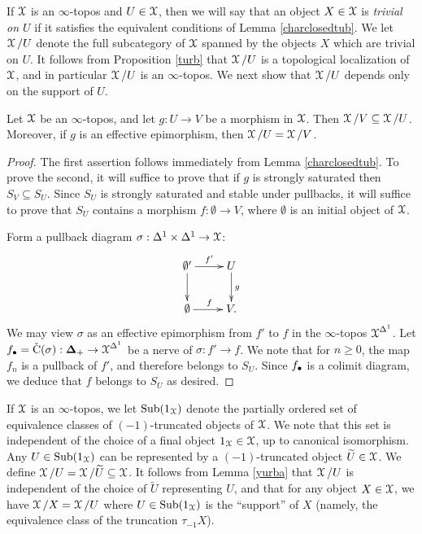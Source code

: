 If $\operatorname{\mathcal{X}}$ is an $\infty$-topos and $U \in \operatorname{\mathcal{X}}$, then we will say that an object
$X \in \operatorname{\mathcal{X}}$ is {\it trivial on $U$}
if it satisfies the equivalent conditions of Lemma \ref{charclosedtub}. We let $\operatorname{\mathcal{X}}/U$ denote the full subcategory of $\operatorname{\mathcal{X}}$ spanned by the objects $X$ which are trivial on $U$. It follows from Proposition \ref{turb} that $\operatorname{\mathcal{X}}/U$ is a topological localization of $\operatorname{\mathcal{X}}$, and in particular $\operatorname{\mathcal{X}}/U$ is an $\infty$-topos. We next show that
$\operatorname{\mathcal{X}}/U$ depends only on the support of $U$.

\begin{lemma}\label{yurba}
Let $\operatorname{\mathcal{X}}$ be an $\infty$-topos, and let $g: U \rightarrow V$ be a morphism in
$\operatorname{\mathcal{X}}$. Then $\operatorname{\mathcal{X}}/V \subseteq \operatorname{\mathcal{X}}/U$. Moreover, if $g$ is an effective epimorphism, then
$\operatorname{\mathcal{X}}/U = \operatorname{\mathcal{X}}/V$. 
\end{lemma}

\begin{proof}
The first assertion follows immediately from Lemma \ref{charclosedtub}. To prove the
second, it will suffice to prove that if $g$ is strongly saturated then $S_{V} \subseteq S_{U}$. Since $S_{U}$ is strongly saturated and stable under pullbacks, it will suffice to prove that $S_{U}$ contains a morphism
$f: \emptyset \rightarrow V$, where $\emptyset$ is an initial object of $\operatorname{\mathcal{X}}$.

Form a pullback diagram $\sigma: \Delta^1 \times \Delta^1 \rightarrow \operatorname{\mathcal{X}}$:
$$ \xymatrix{ \emptyset' \ar[r]^{f'} \ar[d] & U \ar[d]^{g} \\
\emptyset \ar[r]^{f} & V.}$$ We may view $\sigma$ as an effective epimorphism
from $f'$ to $f$ in the $\infty$-topos $\operatorname{\mathcal{X}}^{\Delta^1}$. Let $f_{\bullet} = \operatorname{\check{C}}(\sigma): \operatorname{{\bf \Delta}}_{+} \rightarrow \operatorname{\mathcal{X}}^{\Delta^1}$ be a \Cech nerve of $\sigma: f' \rightarrow f$. We note that
for $n \geq 0$, the map $f_n$ is a pullback of $f'$, and therefore belongs to $S_{U}$. Since
$f_{\bullet}$ is a colimit diagram, we deduce that $f$ belongs to $S_{U}$ as desired.
\end{proof}

If $\operatorname{\mathcal{X}}$ is an $\infty$-topos, we let $\operatorname{Sub}(1_{\operatorname{\mathcal{X}}})$ denote the partially ordered set of equivalence classes of $(-1)$-truncated objects of $\operatorname{\mathcal{X}}$. We note that this set is independent of the choice of a final object $1_{\operatorname{\mathcal{X}}} \in \operatorname{\mathcal{X}}$, up to canonical isomorphism.
Any $U \in \operatorname{Sub}(1_{\operatorname{\mathcal{X}}})$ can be represented by a $(-1)$-truncated object $\widetilde{U} \in \operatorname{\mathcal{X}}$. We define $\operatorname{\mathcal{X}}/U = \operatorname{\mathcal{X}}/ \widetilde{U} \subseteq \operatorname{\mathcal{X}}$. It follows from Lemma \ref{yurba} that $\operatorname{\mathcal{X}}/U$ is independent of the choice of $\widetilde{U}$ representing $U$, and that for any object $X \in \operatorname{\mathcal{X}}$, we
have $\operatorname{\mathcal{X}}/X = \operatorname{\mathcal{X}}/U$ where $U \in \operatorname{Sub}(1_{\operatorname{\mathcal{X}}})$ is the ``support'' of $X$ (namely, the equivalence class of the truncation $\tau_{-1} X$).


